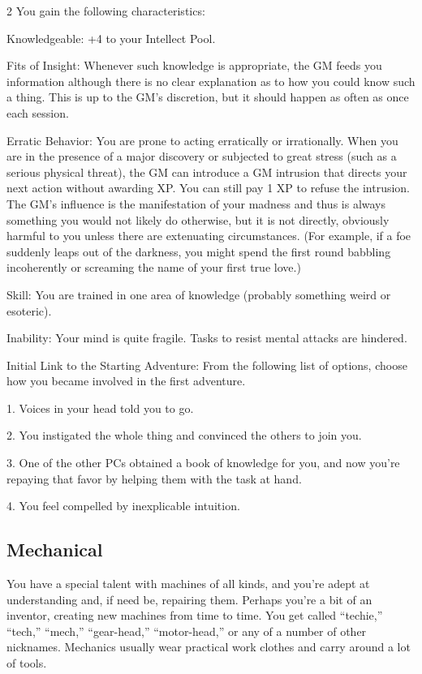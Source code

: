 \begin{multicols}{2}
You gain the following characteristics:

Knowledgeable: +4 to your Intellect Pool.

Fits of Insight: Whenever such knowledge is appropriate, the GM feeds you information although there is no clear explanation as to how you could know such a thing. This is up to the GM’s discretion, but it should happen as often as once each session.

Erratic Behavior: You are prone to acting erratically or irrationally. When you are in the presence of a major discovery or subjected to great stress (such as a serious physical threat), the GM can introduce a GM intrusion that directs your next action without awarding XP. You can still pay 1 XP to refuse the intrusion. The GM’s influence is the manifestation of your madness and thus is always something you would not likely do otherwise, but it is not directly, obviously harmful to you unless there are extenuating circumstances. (For example, if a foe suddenly leaps out of the darkness, you might spend the first round babbling incoherently or screaming the name of your first true love.)

Skill: You are trained in one area of knowledge (probably something weird or esoteric).

Inability: Your mind is quite fragile. Tasks to resist mental attacks are hindered.

Initial Link to the Starting Adventure: From the following list of options, choose how you became involved in the first adventure.

1. Voices in your head told you to go.

2. You instigated the whole thing and convinced the others to join you.

3. One of the other PCs obtained a book of knowledge for you, and now you’re repaying that favor by helping them with the task at hand.

4. You feel compelled by inexplicable intuition.

\subsection{Mechanical}

You have a special talent with machines of all kinds, and you’re adept at understanding and, if need be, repairing them. Perhaps you’re a bit of an inventor, creating new machines from time to time. You get called “techie,” “tech,” “mech,” “gear-head,” “motor-head,” or any of a number of other nicknames. Mechanics usually wear practical work clothes and carry around a lot of tools. 


\end{multicols}
